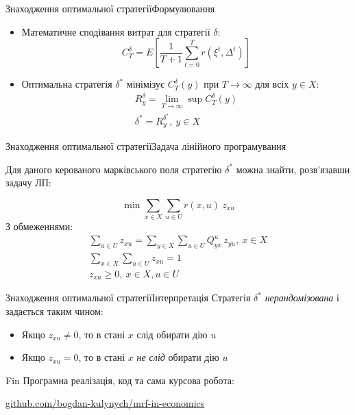 \documentclass[pdf]{beamer}
\begin{document}
\begin{frame}{Знаходження оптимальної стратегії}{Формулювання}
	\begin{itemize}[<+->]
	\item Математичне сподівання витрат для стратегії \(\delta\):
	\[ C_T^{\delta} = E\left[\frac{1}{T+1}\sum_{t=0}^T r(\xi^t, \Delta^t)\right] \]
	\item Оптимальна стратегія \(\delta^*\) мінімізує \(C_T^{\delta}(y)\) при \(T\rightarrow\infty\) для всіх \(y \in X\):
	\begin{gather*}
	R_y^\delta = \lim\limits_{T \rightarrow \infty} \sup C_T^{\delta}(y) \\
	\delta^* = R_y^{\delta^*},\ y \in X
	\end{gather*}
	\end{itemize}
\end{frame}


\begin{frame}{Знаходження оптимальної стратегії}{Задача лінійного програмування}

Для даного керованого марківського поля стратегію \(\delta^*\) можна знайти, розв’язавши задачу ЛП:

\[\min \sum_{x \in X} \sum_{u \in U} r(x, u)\ z_{xu}\]
З обмеженнями:
\begin{gather*}
\sum_{u \in U} z_{xu} = \sum_{y \in X} \sum_{u \in U} Q_{yx}^u\,z_{yu},\ x \in X \\
\sum_{x \in X} \sum_{u \in U} z_{xu} = 1 \\
z_{xu} \geq 0,\ x \in X, u \in U
\end{gather*}

\end{frame}


\begin{frame}{Знаходження оптимальної стратегії}{Інтерпретація}
Стратегія \(\delta^*\) \textit{нерандомізована} і задається таким чином:
\begin{itemize}
	\item Якщо \(z_{xu} \neq 0\), то в стані \(x\) слід обирати дію \(u\)
	\item Якщо \(z_{xu} = 0\), то в стані \(x\) \textit{не слід} обирати дію \(u\)
\end{itemize}
\end{frame}

\begin{frame}{Fin}
Програмна реалізація, код та сама курсова робота:

\begin{center}
	\url{github.com/bogdan-kulynych/mrf-in-economics}
\end{center}

\end{frame}
\end{document}
